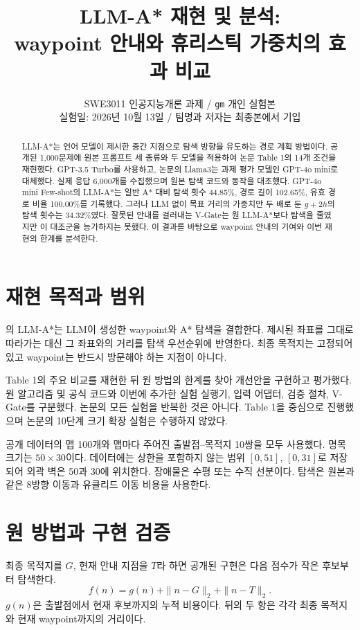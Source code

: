 \documentclass[11pt]{article}
\title{LLM-A* 재현 및 분석:\protect\\waypoint 안내와 휴리스틱 가중치의 효과 비교}
\author{SWE3011 인공지능개론 과제 / \texttt{gm} 개인 실험본\\
실험일: 2026년 10월 13일 / 팀명과 저자는 최종본에서 기입}
\begin{document}
\maketitle
\begin{abstract}
LLM-A*는 언어 모델이 제시한 중간 지점으로 탐색 방향을 유도하는 경로 계획 방법이다. 공개된 1,000문제에 원본 프롬프트 세 종류와 두 모델을 적용하여 논문 Table 1의 14개 조건을 재현했다. GPT-3.5 Turbo를 사용하고, 논문의 Llama3는 과제 평가 모델인 GPT-4o mini로 대체했다. 실제 응답 6,000개를 수집했으며 원본 탐색 코드와 동작을 대조했다. GPT-4o mini Few-shot의 LLM-A*는 일반 A* 대비 탐색 횟수 44.85\%, 경로 길이 102.65\%, 유효 경로 비율 100.00\%를 기록했다. 그러나 LLM 없이 목표 거리의 가중치만 두 배로 둔 $g+2h$의 탐색 횟수는 34.32\%였다. 잘못된 안내를 걸러내는 V-Gate는 원 LLM-A*보다 탐색을 줄였지만 이 대조군을 능가하지는 못했다. 이 결과를 바탕으로 waypoint 안내의 기여와 이번 재현의 한계를 분석한다.
\end{abstract}

\section{재현 목적과 범위}
\citet{meng2025}의 LLM-A*는 LLM이 생성한 waypoint와 A* 탐색을 결합한다. 제시된 좌표를 그대로 따라가는 대신 그 좌표와의 거리를 탐색 우선순위에 반영한다. 최종 목적지는 고정되어 있고 waypoint는 반드시 방문해야 하는 지점이 아니다.

Table 1의 주요 비교를 재현한 뒤 원 방법의 한계를 찾아 개선안을 구현하고 평가했다. 원 알고리즘 및 공식 코드와 이번에 추가한 실험 실행기, 입력 어댑터, 검증 절차, V-Gate를 구분했다. 논문의 모든 실험을 반복한 것은 아니다. Table 1을 중심으로 진행했으며 논문의 10단계 크기 확장 실험은 수행하지 않았다.

공개 데이터의 맵 100개와 맵마다 주어진 출발점--목적지 10쌍을 모두 사용했다. 명목 크기는 $50\times30$이다. 데이터에는 상한을 포함하지 않는 범위 $[0,51]$, $[0,31]$로 저장되어 외곽 벽은 50과 30에 위치한다. 장애물은 수평 또는 수직 선분이다. 탐색은 원본과 같은 8방향 이동과 유클리드 이동 비용을 사용한다.

\section{원 방법과 구현 검증}
최종 목적지를 $G$, 현재 안내 지점을 $T$라 하면 공개된 구현은 다음 점수가 작은 후보부터 탐색한다.
\begin{equation}
 f(n)=g(n)+\|n-G\|_2+\|n-T\|_2.
\end{equation}
$g(n)$은 출발점에서 현재 후보까지의 누적 비용이다. 뒤의 두 항은 각각 최종 목적지와 현재 waypoint까지의 거리이다.
\end{document}

